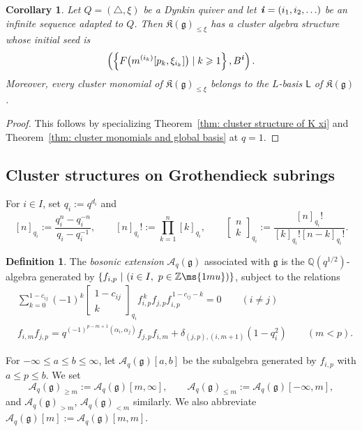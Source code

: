 \documentclass[12pt, leqno]{amsart}
\numberwithin{equation}{section}
\theoremstyle{plain}
\newtheorem{corollary}[lemma]{Corollary}
\theoremstyle{definition}
\newtheorem{definition}[lemma]{Definition}
\renewcommand{\le}{\leqslant}
\renewcommand{\ge}{\geqslant}
\newcommand{\seteq}{\mathbin{:=}}
\newcommand{\g}{\mathfrak{g}}
\newcommand{\Q}{\mathbb{Q}}
\newcommand{\Z}{\mathbb{Z}\ms{1mu}}
\newcommand{\Dynkin}{\triangle}
\newcommand{\ii}{ \textbf{\textit{i}}}
\newcommand{\frakK}{\mathfrak{K}}
\newcommand{\sfL}{\mathsf{L}}
\newcommand{\scrA}{\mathscr{A}}
\begin{document}
\begin{corollary}\label{cor: cluster structure of K xi classical}
Let $Q=(\Dynkin,\xi)$ be a Dynkin quiver and let
$\ii=(i_1,i_2,\ldots)$ be an infinite sequence adapted to $Q$.
Then $\frakK(\g)_{\le\xi}$ has a cluster algebra structure whose
initial seed is
\[
\left(\left\{ F\bigl(m^{(i_k)}[p_k,\xi_{i_k}]\bigr) \mid k\ge1 \right\},  B^\ii \right).
\]
Moreover, every cluster monomial of $\frakK(\g)_{\le\xi}$ belongs to the $L$-basis $\sfL$ of
$\frakK(\g)$.
\end{corollary}

\begin{proof}
This follows by specializing Theorem~\ref{thm: cluster structure of K xi} and Theorem~\ref{thm: cluster monomials and global basis}
at $q=1$.
\end{proof}

\subsection{Cluster structures on Grothendieck subrings}

For $i\in I$, set $q_i\seteq q^{d_i}$ and
\[
[n]_{q_i} \seteq \frac{q_i^n-q_i^{-n}}{q_i-q_i^{-1}},
\qquad
[n]_{q_i}! \seteq \prod_{k=1}^n[k]_{q_i},
\qquad
\begin{bmatrix} n\\ k\end{bmatrix}_{q_i}
\seteq
\frac{[n]_{q_i}!}{[k]_{q_i}![n-k]_{q_i}!}.
\]

\begin{definition} \cite{HL15,FHOO,JLO2}
The \emph{bosonic extension} $\scrA_q(\g)$ associated with $\g$ is
the $\Q(q^{1/2})$-algebra generated by $\{f_{i,p} \ | \  (i\in I,\ p\in\Z) \}$, subject to the relations
\begin{align*}
&\sum_{k=0}^{1-c_{ij}} (-1)^k
\begin{bmatrix}
1-c_{ij}\\ k
\end{bmatrix}_{q_i}
f_{i,p}^{\,k}f_{j,p}f_{i,p}^{\,1-c_{ij}-k} =0 \qquad (i\ne j)\\
&
f_{i,m}f_{j,p} = q^{(-1)^{p-m+1}(\alpha_i,\alpha_j)} f_{j,p}f_{i,m} + \delta_{(j,p),(i,m+1)}(1-q_i^2)
\qquad (m<p).
\end{align*}

For $-\infty\le a\le b\le\infty$, let
$\scrA_q(\g)[a,b]$ be the subalgebra generated by
$f_{i,p}$ with $a\le p\le b$.  We set
\[
\scrA_q(\g)_{\ge m} \seteq \scrA_q(\g)[m,\infty], \qquad \scrA_q(\g)_{\le m} \seteq \scrA_q(\g)[-\infty,m],
\]
and
$\scrA_q(\g)_{>m}$, $\scrA_q(\g)_{<m}$ similarly. We also abbreviate $\scrA_q(\g)[m]\seteq\scrA_q(\g)[m,m]$.

\end{definition}
\end{document}
